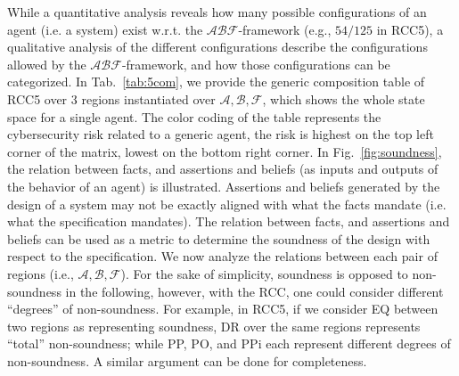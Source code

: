 \documentclass[runningheads]{llncs}
\newcommand{\assertionRegion}{\mathcal{A}}
\newcommand{\beliefRegion}{\mathcal{B}}
\newcommand{\factRegion}{\mathcal{F}}
\newcommand{\abf}{\assertionRegion,\beliefRegion,\factRegion}
\newcommand{\abftheory}{\assertionRegion\beliefRegion\factRegion}
\begin{document}
While a quantitative analysis reveals how many possible configurations of an
agent (i.e. a system) exist w.r.t. the $\abftheory$-framework (e.g., $54/125$ in RCC5), a
qualitative analysis of the different configurations describe the
configurations allowed by the $\abftheory$-framework, and how those configurations can
be categorized.  In Tab.~\ref{tab:5com}, we provide the generic composition
table of RCC5 over 3 regions instantiated over $\abf$, which shows the whole
state space for a single agent. The color coding of the table represents the
cybersecurity risk related to a generic agent, the risk is highest on the top left
corner of the matrix, lowest on the bottom right corner. 
In Fig.~\ref{fig:soundness}, the relation between facts, and assertions and
beliefs (as inputs and outputs of the behavior of an agent) is illustrated.
Assertions and beliefs generated by the design of a system may not be exactly
aligned with what the facts mandate (i.e. what the specification mandates).
The relation between facts, and assertions and beliefs can be used as a metric
to determine the soundness of the design with respect to the specification.
We now analyze the relations between each pair of
regions (i.e., $\abf$). For the sake of simplicity, soundness is
opposed to non-soundness in the following, however, with the RCC, one could
consider different ``degrees'' of non-soundness.  For example, in RCC5, if we
consider EQ between two regions as representing soundness, DR over the same
regions represents ``total'' non-soundness; while PP, PO, and PPi each represent different
degrees of non-soundness.  A similar argument can be done for completeness.  
\end{document}

